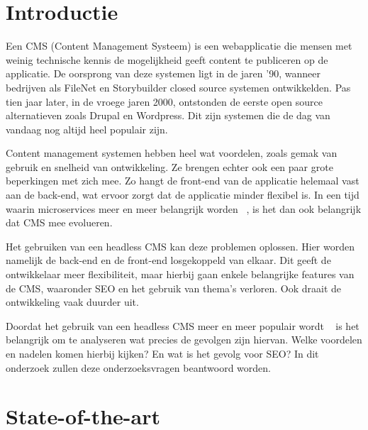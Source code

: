 
\section{Introductie} %
\label{sec:introductie}

Een CMS (Content Management Systeem) is een 
webapplicatie die mensen met weinig technische kennis de mogelijkheid geeft content te publiceren op de applicatie. De oorsprong van deze systemen ligt in de jaren '90, wanneer bedrijven als FileNet en Storybuilder closed source systemen ontwikkelden. Pas tien jaar later, in de vroege jaren 2000, ontstonden de eerste open source alternatieven zoals Drupal en Wordpress. Dit zijn systemen die de dag van vandaag nog altijd heel populair zijn. ~\autocite{Burgy2020}

Content management systemen hebben heel wat voordelen, zoals gemak van gebruik en snelheid van ontwikkeling. Ze brengen echter ook een paar grote beperkingen met zich mee. Zo hangt de front-end van de applicatie helemaal vast aan de back-end, wat ervoor zorgt dat de applicatie minder flexibel is. In een tijd waarin microservices meer en meer belangrijk worden ~\autocite{Shabani2021}, is het dan ook belangrijk dat CMS mee evolueren.

Het gebruiken van een headless CMS kan deze problemen oplossen. Hier worden namelijk de back-end en de front-end losgekoppeld van elkaar. Dit geeft de ontwikkelaar meer flexibiliteit, maar hierbij gaan enkele belangrijke features van de CMS, waaronder SEO en het gebruik van thema's verloren. Ook draait de ontwikkeling vaak duurder uit. ~\autocite{Luksza}

Doordat het gebruik van een headless CMS meer en meer populair wordt ~\autocite{Luksza} is het belangrijk om te analyseren wat precies de gevolgen zijn hiervan. Welke voordelen en nadelen komen hierbij kijken? En wat is het gevolg voor SEO? In dit onderzoek zullen deze onderzoeksvragen beantwoord worden. 


\section{State-of-the-art}
\label{sec:state-of-the-art}

